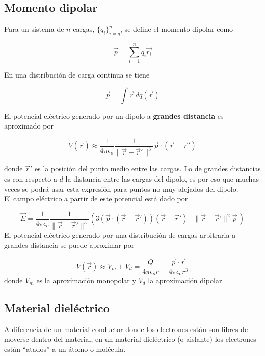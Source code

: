 \subsection{Momento dipolar}

Para un sistema de $n$ cargas, $\{q_i\}^n_{i=q}$, se define el momento dipolar como

\[\Vec{p}=\sum^n_{i=1}q_i\Vec{r_i}\]

En una distribución de carga continua se tiene

\[\Vec{p}=\int\Vec{r}\,dq(\Vec{r})\]
\bigbreak

El potencial eléctrico generado por un dipolo a \textbf{grandes distancia} es aproximado por

\[V(\Vec{r}) \approx \frac{1}{4\pi\epsilon_o}
\frac{1}{\|\Vec{r}-\Vec{r}'\|^3}\Vec{p}\cdot
(\Vec{r}-\Vec{r}')\]
\bigbreak

donde $\Vec{r}'$ es la posición del punto medio entre las cargas. Lo de grandes distancias es con respecto a $d$ la distancia entre las cargas del dipolo, es por eso que muchas veces se podrá usar esta expresión para puntos no muy alejados del dipolo.\\

El campo eléctrico a partir de este potencial está dado por

\[\Vec{E}= \frac{1}{4\pi\epsilon_o}
\frac{1}{\|\Vec{r}-\Vec{r}'\|^5}\left(3(\Vec{p}\cdot
(\Vec{r}-\Vec{r}'))(\Vec{r}-\Vec{r}')-\|\Vec{r}-\Vec{r}'\|^2\Vec{p}\,\right)\]
\bigbreak
El potencial eléctrico generado por una distribución de cargas arbitraria a grandes distancia se puede aproximar por

\[V(\Vec{r}) \approx V_m + V_d = 
\frac{Q}{4\pi\epsilon_o r}+\frac{\Vec{p}\cdot\Vec{r}}{4\pi\epsilon_o r^3}\]
\bigbreak
donde $V_m$ es la aproximación monopolar y $V_d$ la aproximación dipolar.\\


\subsection{Material dieléctrico}

A diferencia de un material conductor donde los electrones están son libres de moverse dentro del material, en un material dieléctrico (o aislante) los electrones están ``atados'' a un átomo o molécula.\\

